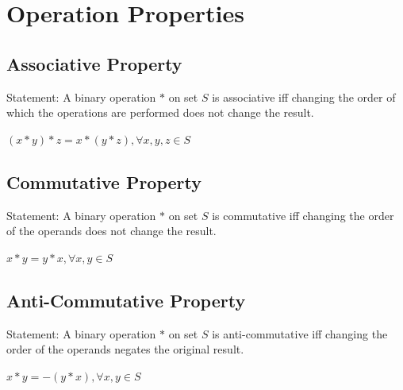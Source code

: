 \chapter{Operation Properties}

\section{Associative Property}
Statement:
A binary operation $*$ on set $S$ is associative iff changing the order of which the operations are performed
does not change the result.

\begin{center}
    $(x * y) * z = x * (y * z), \forall x,y,z \in S$
\end{center}



\section{Commutative Property}
Statement:
A binary operation $*$ on set $S$ is commutative iff changing the order of the operands does not change
the result.

\begin{center}
    $x * y = y * x, \forall x,y \in S$
\end{center}

\section{Anti-Commutative Property}
Statement:
A binary operation $*$ on set $S$ is anti-commutative iff changing the order of the operands negates the original
result.

\begin{center}
    $x * y = -(y * x), \forall x,y \in S$
\end{center}

